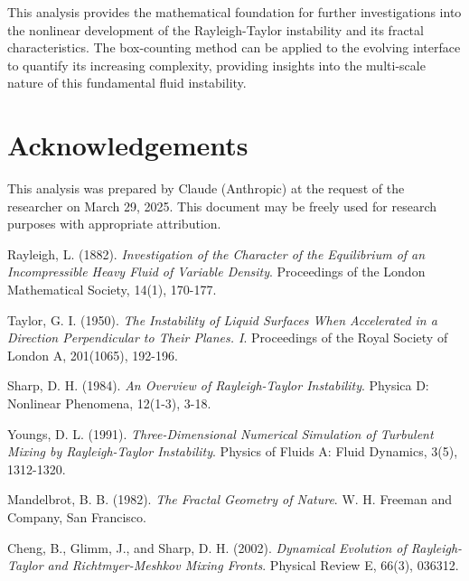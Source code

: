 \documentclass[12pt,a4paper]{article}
\begin{document}
This analysis provides the mathematical foundation for further investigations into the nonlinear development of the Rayleigh-Taylor instability and its fractal characteristics. The box-counting method can be applied to the evolving interface to quantify its increasing complexity, providing insights into the multi-scale nature of this fundamental fluid instability.

\section*{Acknowledgements}
This analysis was prepared by Claude (Anthropic) at the request of the researcher on March 29, 2025. This document may be freely used for research purposes with appropriate attribution.

\begin{thebibliography}{9}

Rayleigh, L. (1882).
\emph{Investigation of the Character of the Equilibrium of an Incompressible Heavy Fluid of Variable Density}.
Proceedings of the London Mathematical Society, 14(1), 170-177.

Taylor, G. I. (1950).
\emph{The Instability of Liquid Surfaces When Accelerated in a Direction Perpendicular to Their Planes. I}.
Proceedings of the Royal Society of London A, 201(1065), 192-196.

Sharp, D. H. (1984).
\emph{An Overview of Rayleigh-Taylor Instability}.
Physica D: Nonlinear Phenomena, 12(1-3), 3-18.

Youngs, D. L. (1991).
\emph{Three-Dimensional Numerical Simulation of Turbulent Mixing by Rayleigh-Taylor Instability}.
Physics of Fluids A: Fluid Dynamics, 3(5), 1312-1320.

Mandelbrot, B. B. (1982).
\emph{The Fractal Geometry of Nature}.
W. H. Freeman and Company, San Francisco.

Cheng, B., Glimm, J., and Sharp, D. H. (2002).
\emph{Dynamical Evolution of Rayleigh-Taylor and Richtmyer-Meshkov Mixing Fronts}.
Physical Review E, 66(3), 036312.

\end{thebibliography}
\end{document}
